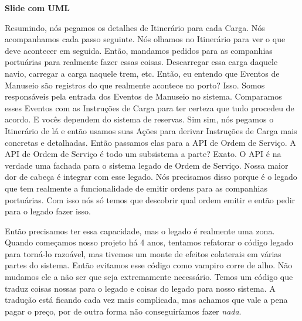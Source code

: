 \documentclass[12pt,play]{article}
\begin{document}
\narr \textbf{Slide com UML}

\scene
\julian Resumindo, nós pegamos os detalhes de Itinerário para cada Carga. Nós acompanhamos cada passo seguinte. Nós olhamos no Itinerário para ver o que deve acontecer em seguida. Então, mandamos pedidos para as companhias portuárias para realmente fazer essas coisas. Descarregar essa carga daquele navio, carregar a carga naquele trem, etc.
\dani Então, eu entendo que Eventos de Manuseio são registros do que realmente acontece no porto?
\julian Isso. Somos responsáveis pela entrada dos Eventos de Manuseio no sistema. Comparamos esses Eventos com as Instruções de Carga para ter certeza que tudo procedeu de acordo.
\dani E vocês dependem do sistema de reservas.
\julian Sim sim, nós pegamos o Itinerário de lá e então usamos suas Ações para derivar Instruções de Carga mais concretas e detalhadas. Então passamos elas para a API de Ordem de Serviço.
\dani A API de Ordem de Serviço é todo um subsistema a parte?
\julian Exato. O API é na verdade uma fachada para o sistema legado de Ordem de Serviço. Nossa maior dor de cabeça é integrar com esse legado. Nós precisamos disso porque é o legado que tem realmente a funcionalidade de emitir ordens para as companhias portuárias. Com isso nós só temos que descobrir qual ordem emitir e então pedir para o legado fazer isso.

Então precisamos ter essa capacidade, mas o legado é realmente uma zona. Quando começamos nosso projeto há 4 anos, tentamos refatorar o código legado para torná-lo razoável, mas tivemos um monte de efeitos colaterais em várias partes do sistema. Então evitamos esse código como vampiro corre de alho. Não mudamos ele a não ser que seja extremamente necessário. Temos um código que traduz coisas nossas para o legado e coisas do legado para nosso sistema. A tradução está ficando cada vez mais complicada, mas achamos que vale a pena pagar o preço, por de outra forma não conseguiríamos fazer \emph{nada}.
\narr {}
\end{document}
